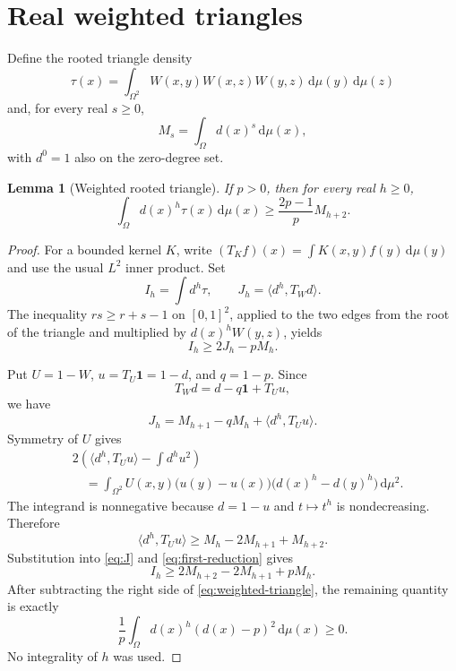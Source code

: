 \documentclass[11pt]{article}
\newtheorem{lemma}[theorem]{Lemma}
\newcommand{\dd}{\,\mathrm d}
\begin{document}
\section{Real weighted triangles}

Define the rooted triangle density
\[
 \tau(x)=\int_{\Omega^2}
 W(x,y)W(x,z)W(y,z)\dd\mu(y)\dd\mu(z)
\]
and, for every real $s\geq0$,
\[
 M_s=\int_\Omega d(x)^s\dd\mu(x),
\]
with $d^0=1$ also on the zero-degree set.

\begin{lemma}[Weighted rooted triangle]
\label{lem:weighted-triangle}
If $p>0$, then for every real $h\geq0$,
\begin{equation}
 \int_\Omega d(x)^h\tau(x)\dd\mu(x)
 \geq\frac{2p-1}{p}M_{h+2}.
 \label{eq:weighted-triangle}
\end{equation}
\end{lemma}

\begin{proof}
For a bounded kernel $K$, write
$(T_Kf)(x)=\int K(x,y)f(y)\dd\mu(y)$ and use the usual $L^2$ inner
product.  Set
\[
 I_h=\int d^h\tau,
 \qquad J_h=\langle d^h,T_Wd\rangle.
\]
The inequality $rs\geq r+s-1$ on $[0,1]^2$, applied to the two edges
from the root of the triangle and multiplied by $d(x)^hW(y,z)$, yields
\begin{equation}
 I_h\geq2J_h-pM_h.
 \label{eq:first-reduction}
\end{equation}

Put $U=1-W$, $u=T_U\mathbf1=1-d$, and $q=1-p$.  Since
\[
 T_Wd=d-q\mathbf1+T_Uu,
\]
we have
\begin{equation}
 J_h=M_{h+1}-qM_h+\langle d^h,T_Uu\rangle.
 \label{eq:J}
\end{equation}
Symmetry of $U$ gives
\begin{align*}
 &2\left(\langle d^h,T_Uu\rangle-\int d^hu^2\right)\\
 &\quad=
 \int_{\Omega^2}U(x,y)
 \bigl(u(y)-u(x)\bigr)
 \bigl(d(x)^h-d(y)^h\bigr)\dd\mu^2.
\end{align*}
The integrand is nonnegative because $d=1-u$ and $t\mapsto t^h$ is
nondecreasing.  Therefore
\[
 \langle d^h,T_Uu\rangle
 \geq M_h-2M_{h+1}+M_{h+2}.
\]
Substitution into \eqref{eq:J} and \eqref{eq:first-reduction} gives
\[
 I_h\geq2M_{h+2}-2M_{h+1}+pM_h.
\]
After subtracting the right side of \eqref{eq:weighted-triangle}, the
remaining quantity is exactly
\[
 \frac1p\int_\Omega d(x)^h(d(x)-p)^2\dd\mu(x)\geq0.
\]
No integrality of $h$ was used.
\end{proof}
\end{document}
